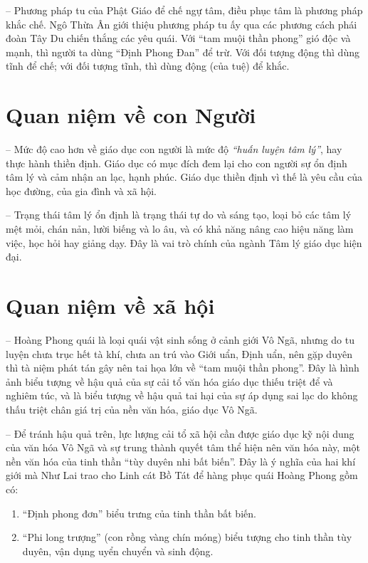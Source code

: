 -- Phương pháp tu của Phật Giáo để chế ngự tâm, điều phục tâm là phương pháp khắc chế. Ngô Thừa Ân giới thiệu phương pháp tu ấy qua các phương cách phái đoàn Tây Du chiến thắng các yêu quái. Với ``tam muội thần phong'' gió độc và mạnh, thì người ta dùng ``Định Phong Đan'' để trừ. Với đối tượng động thì dùng tĩnh để chế; với đối tượng tĩnh, thì dùng động (của tuệ) để khắc.

\section{Quan niệm về con Người} %
\label{sec:20_21_22_con_nguoi}

-- Mức độ cao hơn về giáo dục con người là mức độ \emph{``huấn luyện tâm lý''}, hay thực hành thiền định. Giáo dục có mục đích đem lại cho con người sự ổn định tâm lý và cảm nhận an lạc, hạnh phúc. Giáo dục thiền định vì thế là yêu cầu của học đường, của gia đình và xã hội.

-- Trạng thái tâm lý ổn định là trạng thái tự do và sáng tạo, loại bỏ các tâm lý mệt mỏi, chán nản, lười biếng và lo âu, và có khả năng nâng cao hiệu năng làm việc, học hỏi hay giảng dạy. Đây là vai trò chính của ngành Tâm lý giáo dục hiện đại.

\section{Quan niệm về xã hội} %
\label{sec:20_21_22_xa_hoi}

-- Hoàng Phong quái là loại quái vật sinh sống ở cảnh giới Vô Ngã, nhưng do tu luyện chưa trục hết tà khí, chưa an trú vào Giới uẩn, Định uẩn, nên gặp duyên thì tà niệm phát tán gây nên tai họa lớn về ``tam muội thần phong''. Đây là hình ảnh biểu tượng về hậu quả của sự cải tổ văn hóa giáo dục thiếu triệt để và nghiêm túc, và là biểu tượng về hậu quả tai hại của sự áp dụng sai lạc do không thấu triệt chân giá trị của nền văn hóa, giáo dục Vô Ngã.

-- Để tránh hậu quả trên, lực lượng cải tổ xã hội cần được giáo dục kỹ nội dung của văn hóa Vô Ngã và sự trung thành quyết tâm thể hiện nên văn hóa này, một nền văn hóa của tinh thần ``tùy duyên nhi bất biến''. Đây là ý nghĩa của hai khí giới mà Như Lai trao cho Linh cát Bồ Tát để hàng phục quái Hoàng Phong gồm có:

\begin{enumerate}[label=\itshape\arabic*\upshape/]
   \item ``Định phong đơn'' biểu trưng của tinh thần bất biến.

   \item ``Phi long trượng'' (con rồng vàng chín móng) biểu tượng cho tinh thần tùy duyên, vận dụng uyển chuyển và sinh động.
\end{enumerate}

